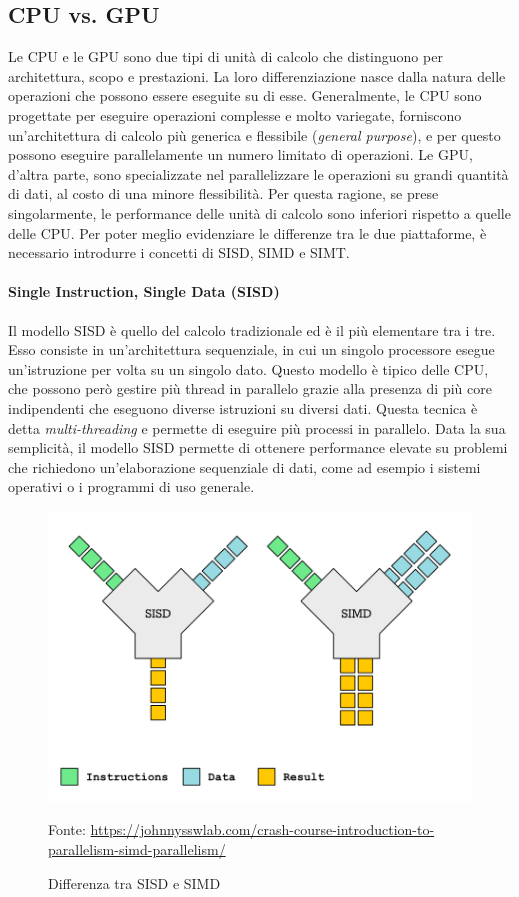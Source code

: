 \subsection{CPU vs. GPU}
\label{subsec:cpuvsgpu}

Le CPU e le GPU sono due tipi di unità di calcolo che distinguono per architettura,
scopo e prestazioni. La loro differenziazione nasce dalla natura delle operazioni
che possono essere eseguite su di esse. Generalmente, le CPU sono progettate per
eseguire operazioni complesse e molto variegate, forniscono un'architettura di
calcolo più generica e flessibile (\textit{general purpose}), e per questo
possono eseguire parallelamente un numero limitato di operazioni. Le GPU, d'altra
parte, sono specializzate nel parallelizzare le operazioni su grandi quantità di
dati, al costo di una minore flessibilità. Per questa ragione, se prese
singolarmente, le performance delle unità di calcolo sono inferiori rispetto a quelle
delle CPU. Per poter meglio evidenziare le differenze tra le due piattaforme, è necessario
introdurre i concetti di SISD, SIMD e SIMT.

\paragraph{Single Instruction, Single Data (SISD)}
\label{para:simd}

Il modello SISD è quello del calcolo tradizionale ed è il più elementare tra i
tre. Esso consiste in un'architettura sequenziale, in cui un singolo processore
esegue un'istruzione per volta su un singolo dato. Questo modello è tipico delle
CPU, che possono però gestire più thread in parallelo grazie alla presenza di
più core indipendenti che eseguono diverse istruzioni su diversi dati. Questa tecnica
è detta \textit{multi-threading} e permette di eseguire più processi in
parallelo. Data la sua semplicità, il modello SISD permette di ottenere
performance elevate su problemi che richiedono un'elaborazione sequenziale di
dati, come ad esempio i sistemi operativi o i programmi di uso generale.

\begin{figure}[h!]
  \centering
  \includegraphics[width=.40\linewidth]{images/examples/sisd-simd.png}
  \caption{Differenza tra SISD e SIMD}
  \label{fig:sisd-simt} \footnotesize{Fonte: \url{https://johnnysswlab.com/crash-course-introduction-to-parallelism-simd-parallelism/}}
\end{figure}

